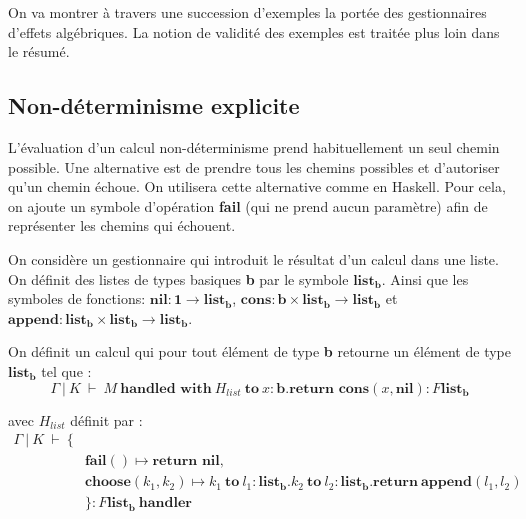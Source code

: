 On va montrer à travers une succession d'exemples la portée des gestionnaires d'effets algébriques. La notion de validité des exemples est traitée plus loin dans le résumé.

\subsection{Non-déterminisme explicite}

	L'évaluation d'un calcul non-déterminisme prend habituellement un seul chemin possible. Une alternative est de prendre tous les chemins possibles et d'autoriser qu'un chemin échoue. On utilisera cette alternative comme en Haskell. Pour cela, on ajoute un symbole d'opération \textbf{fail} (qui ne prend aucun paramètre) afin de représenter les chemins qui échouent.
	
	On considère un gestionnaire qui introduit le résultat d'un calcul dans une liste. On définit des listes de types basiques \textbf{b} par le symbole $\textbf{list}_\textbf{b}$. Ainsi que les symboles de fonctions: 
	$\textbf{nil} : \textbf{1} \rightarrow \textbf{list}_\textbf{b}$, 
	$\textbf{cons}: \textbf{b} \times \textbf{list}_\textbf{b} \rightarrow \textbf{list}_\textbf{b}$ et $\textbf{append} : \textbf{list}_\textbf{b} \times \textbf{list}_\textbf{b} \rightarrow \textbf{list}_\textbf{b}$.
	\smallbreak
	
	On définit un calcul qui pour tout élément de type \textbf{b} retourne un élément de type $\textbf{list}_\textbf{b}$ tel que : 
	\[\Gamma~|~K~\vdash~M~\textbf{handled~with}~H_{list}~\textbf{to}~x:\textbf{b}.\textbf{return~cons}(x,\textbf{nil}):F\textbf{list}_\textbf{b}\]

	avec $H_{list}$ définit par :
	\begin{align*}
		\Gamma~|~K~\vdash~\{& \\
		 &\textbf{fail}() \mapsto \textbf{return~nil},\\
		 &\textbf{choose}(k_1,k_2) \mapsto k_1~\textbf{to}~l_1:\textbf{list}_\textbf{b}.k_2~\textbf{to}~l_2:\textbf{list}_\textbf{b}.\textbf{return}~\textbf{append}(l_1,l_2) \\
		 &\}:F\textbf{list}_\textbf{b}~\textbf{handler}
	\end{align*}

